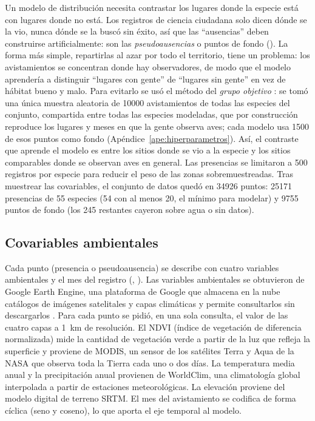 Un modelo de distribución necesita contrastar los lugares donde la especie
está con lugares donde no está. Los registros de ciencia ciudadana solo
dicen dónde se la vio, nunca dónde se la buscó sin éxito, así que las
``ausencias'' deben construirse artificialmente: son las
\emph{pseudoausencias} o puntos de fondo (). La
forma más simple, repartirlas al azar por todo el territorio, tiene un
problema: los avistamientos se concentran donde hay observadores, de modo
que el modelo aprendería a distinguir ``lugares con gente'' de ``lugares sin
gente'' en vez de hábitat bueno y malo. Para evitarlo se usó el método del
\emph{grupo objetivo} \citep{phillips2009bias}: se tomó una única muestra
aleatoria de \num{10000} avistamientos de todas las especies del conjunto,
compartida entre todas las especies modeladas, que por construcción
reproduce los lugares y meses en que la gente observa aves; cada modelo usa
\num{1500} de esos puntos como fondo (Apéndice~\ref{ape:hiperparametros}).
Así, el contraste que aprende el modelo es entre los sitios donde se vio a
la especie y los sitios comparables donde se observan aves en general. Las
presencias se limitaron a 500 registros por especie para reducir el peso de
las zonas sobremuestreadas. Tras muestrear las covariables, el conjunto de
datos quedó en \num{34926} puntos: \num{25171} presencias de 55 especies (54
con al menos 20, el mínimo para modelar) y \num{9755} puntos de fondo (los
245 restantes cayeron sobre agua o sin datos).

\subsection{Covariables ambientales}\label{sec:covariables}

Cada punto (presencia o pseudoausencia) se describe con cuatro variables
ambientales y el mes del registro (,
). Las variables ambientales se obtuvieron de
Google Earth Engine, una plataforma de Google que almacena en la nube
catálogos de imágenes satelitales y capas climáticas y permite consultarlos
sin descargarlos \citep{gorelick2017gee}. Para cada punto se pidió, en una
sola consulta, el valor de las cuatro capas a \SI{1}{\kilo\metre} de
resolución. El NDVI (índice de vegetación de diferencia normalizada) mide la
cantidad de vegetación verde a partir de la luz que refleja la superficie y
proviene de MODIS, un sensor de los satélites Terra y Aqua de la NASA que
observa toda la Tierra cada uno o dos días. La temperatura media anual y la
precipitación anual provienen de WorldClim, una climatología global
interpolada a partir de estaciones meteorológicas. La elevación proviene del
modelo digital de terreno SRTM. El mes del avistamiento se codifica de forma
cíclica (seno y coseno), lo que aporta el eje temporal al modelo.

